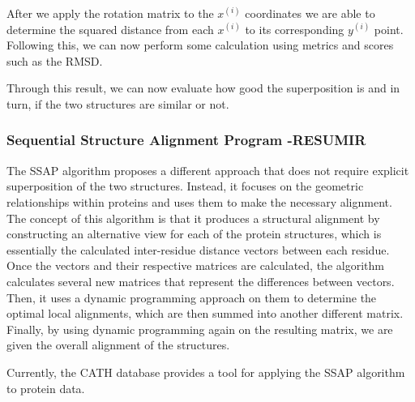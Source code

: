 After we apply the rotation matrix to the $x^{(i)}$ coordinates we are able to determine the squared distance from each $x^{(i)}$ to its corresponding $y^{(i)}$ point. Following this, we can now perform some calculation using metrics and scores such as the RMSD.

Through this result, we can now evaluate how good the superposition is and in turn, if the two structures are similar or not.

\subsubsection{Sequential Structure Alignment Program -RESUMIR}

The SSAP \cite{orengo199636} algorithm proposes a different approach that does not require explicit superposition of the two structures. Instead, it focuses on the geometric relationships within proteins and uses them to make the necessary alignment. The concept of this algorithm is that it produces a structural alignment by constructing an alternative view for each of the protein structures, which is essentially the calculated inter-residue distance vectors between each residue. Once the vectors and their respective matrices are calculated, the algorithm calculates several new matrices that represent the differences between vectors. Then, it uses a dynamic programming approach on them to determine the optimal local alignments, which are then summed into another different matrix. Finally, by using dynamic programming again on the resulting matrix, we are given the overall alignment of the structures.

Currently, the CATH database \cite{sillitoe2014cath} provides a tool for applying the SSAP algorithm to protein data.

